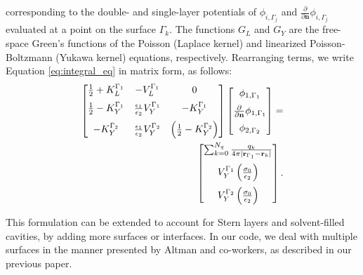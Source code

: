 \noindent corresponding to the double- and single-layer potentials of $\phi_{i,\Gamma_j}$ and $\frac{\partial}{\partial \mathbf{n}} \phi_{i,\Gamma_j}$ evaluated at a point on the surface $\Gamma_k$. The functions $G_L$ and $G_Y$ are the free-space Green's functions of the Poisson (Laplace kernel) and linearized Poisson-Boltzmann (Yukawa kernel) equations, respectively. Rearranging terms, we write Equation \eqref{eq:integral_eq} in matrix form, as follows:
%
 \begin{align} \label{eq:matrix_dphi}
 \left[
    \begin{matrix} %
       \frac{1}{2} + K_{L}^{\Gamma_1} & -V_{L}^{\Gamma_1} & 0 \vspace{0.2cm}\\
       \frac{1}{2} - K_{Y}^{\Gamma_1} &  \frac{\epsilon_1}{\epsilon_2} V_{Y}^{\Gamma_1} & -K_{Y}^{\Gamma_1} \vspace{0.2cm} \\
       - K_{Y}^{\Gamma_2} & \frac{\epsilon_1}{\epsilon_2} V_{Y}^{\Gamma_2} & \left(\frac{1}{2} - K_{Y}^{\Gamma_2}\right) \\
    \end{matrix}
    \right] \left[ 
    \begin{matrix} %
       \phi_{1,\Gamma_1} \vspace{0.2cm} \\
       \frac{\partial}{\partial \mathbf{n}} \phi_{1,\Gamma_1} \vspace{0.2cm}\\
       \phi_{2,\Gamma_2}\\
    \end{matrix} 
     \right] =   \nonumber \\
    \left[
    \begin{matrix} %
       \sum_{k=0}^{N_q} \frac{q_k}{4\pi|\mathbf{r}_{\Gamma_1} - \mathbf{r}_k|} \vspace{0.2cm} \\
        V_{Y}^{\Gamma_1} \left( \frac{\sigma_0}{\epsilon_2} \right) \vspace{0.2cm} \\
        V_{Y}^{\Gamma_2} \left( \frac{\sigma_0}{\epsilon_2} \right)
    \end{matrix}
    \right].
 \end{align}

This formulation can be extended to account for Stern layers and solvent-filled cavities, by adding more surfaces or interfaces. In our code, we deal with multiple surfaces in the manner presented by Altman and co-workers,\cite{AltmanBardhanWhiteTidor09} as described in our previous paper.\cite{CooperBardhanBarba2013}

